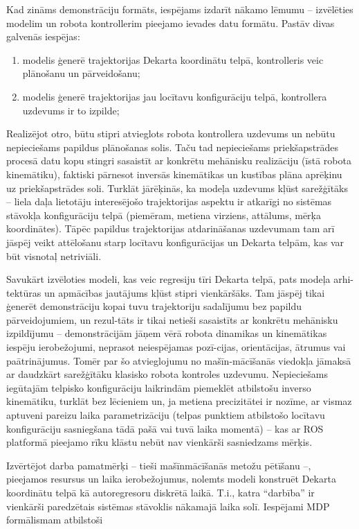 \documentclass[12pt, a4paper]{article}
\numberwithin{equation}{section} %
\begin{document}
Kad zināms demonstrāciju formāts, iespējams izdarīt nākamo lēmumu -- izvēlēties modelim un robota kontrollerim pieejamo ievades datu formātu. Pastāv divas galvenās iespējas:

\begin{enumerate}
    \item modelis ģenerē trajektorijas Dekarta koordinātu telpā, kontrolleris veic plānošanu un pārveidošanu;
    \item modelis ģenerē trajektorijas jau locītavu konfigurāciju telpā, kontrollera uzdevums ir to izpilde;
\end{enumerate}

Realizējot otro, būtu stipri atvieglots robota kontrollera uzdevums un nebūtu nepieciešams papildus plānošanas solis. Taču tad nepieciešams priekšapstrādes procesā datu kopu stingri sasaistīt ar konkrētu mehānisku realizāciju (īstā robota kinemātiku), faktiski pārnesot inversās kinemātikas un kustības plāna aprēķinu uz priekšapstrādes soli. Turklāt jārēķinās, ka modeļa uzdevums kļūst sarežģītāks -- liela daļa lietotāju interesējošo trajektorijas aspektu ir atkarīgi no sistēmas stāvokļa konfigurāciju telpā (piemēram, metiena virziens, attālums, mērķa koordinātes). Tāpēc papildus trajektorijas atdarināšanas uzdevumam tam arī jāspēj veikt attēlošanu starp locītavu konfigurācijas un Dekarta telpām, kas var būt visnotaļ netriviāli.  

Savukārt izvēloties modeli, kas veic regresiju tīri Dekarta telpā, pats modeļa arhi-tektūras un apmācības jautājums kļūst stipri vienkāršāks. Tam jāspēj tikai ģenerēt demonstrāciju kopai tuvu trajektoriju sadalījumu bez papildu pārveidojumiem, un rezul-tāts ir tikai netieši sasaistīts ar konkrētu mehānisku izpildījumu -- demonstrācijām jāņem vērā robota dinamikas un kinemātikas iespēju ierobežojumi, neprasot neiespējamas pozī-cijas, orientācijas, ātrumus vai paātrinājumus. Tomēr par šo atvieglojumu no mašīn-mācīšanās viedokļa jāmaksā ar daudzkārt sarežģītāku klasisko robota kontroles uzdevumu. Nepieciešams iegūtajām telpisko konfigurāciju laikrindām piemeklēt atbilstošu inverso kinemātiku, turklāt bez lēcieniem un, ja metiena precizitātei ir nozīme, ar vismaz aptuveni pareizu laika parametrizāciju (telpas punktiem atbilstošo locītavu konfigurāciju sasniegšana tādā pašā vai tuvā laika momentā) -- kas ar ROS platformā pieejamo rīku klāstu nebūt nav vienkārši sasniedzams mērķis.

Izvērtējot darba pamatmērķi -- tieši mašīnmācīšanās metožu pētīšanu --, pieejamos resursus un laika ierobežojumus, nolemts modeli konstruēt Dekarta koordinātu telpā kā autoregresoru diskrētā laikā. T.i., katra ``darbība'' ir vienkārši paredzētais sistēmas stāvoklis nākamajā laika solī. Iespējami MDP formālismam atbilstoši
\end{document}
